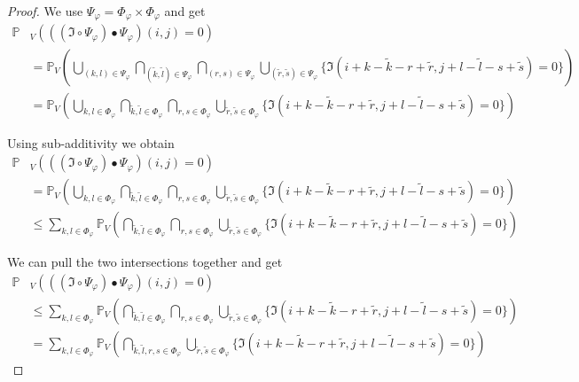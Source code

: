 \documentclass[a4paper,12pt]{article}
\theoremstyle{plain}
\theoremstyle{definition}
\begin{document}
\begin{proof}
	We use $\Psi_\varphi = \Phi_\varphi \times \Phi_\varphi$ and get
	\begin{align*}
		\mathbb{P}&_V( ((\mathfrak{I} \circ \Psi_\varphi) \bullet \Psi_\varphi)(i, j) = 0 ) \\
		&= \mathbb{P}_V\left( \bigcup_{(k, l) \in \Psi_\varphi} \bigcap_{(\tilde{k}, \tilde{l}) \in \Psi_\varphi} \bigcap_{(r, s) \in \Psi_\varphi} \bigcup_{(\tilde{r}, \tilde{s}) \in \Psi_\varphi} \{ \mathfrak{I}(i + k - \tilde{k} - r + \tilde{r}, j + l - \tilde{l} - s + \tilde{s}) = 0 \} \right) \\
		&= \mathbb{P}_V\left( \bigcup_{k, l \in \Phi_\varphi} \bigcap_{\tilde{k}, \tilde{l} \in \Phi_\varphi} \bigcap_{r, s \in \Phi_\varphi} \bigcup_{\tilde{r}, \tilde{s} \in \Phi_\varphi} \{ \mathfrak{I}(i + k - \tilde{k} - r + \tilde{r}, j + l - \tilde{l} - s + \tilde{s}) = 0 \} \right)
	\end{align*}
	
	Using sub-additivity we obtain
	\begin{align*}
		\mathbb{P}&_V( ((\mathfrak{I} \circ \Psi_\varphi) \bullet \Psi_\varphi)(i, j) = 0 ) \\
		&= \mathbb{P}_V\left( \bigcup_{k, l \in \Phi_\varphi} \bigcap_{\tilde{k}, \tilde{l} \in \Phi_\varphi} \bigcap_{r, s \in \Phi_\varphi} \bigcup_{\tilde{r}, \tilde{s} \in \Phi_\varphi} \{ \mathfrak{I}(i + k - \tilde{k} - r + \tilde{r}, j + l - \tilde{l} - s + \tilde{s}) = 0 \} \right) \\
		&\leq \sum_{k, l \in \Phi_\varphi} \mathbb{P}_V\left( \bigcap_{\tilde{k}, \tilde{l} \in \Phi_\varphi} \bigcap_{r, s \in \Phi_\varphi} \bigcup_{\tilde{r}, \tilde{s} \in \Phi_\varphi} \{ \mathfrak{I}(i + k - \tilde{k} - r + \tilde{r}, j + l - \tilde{l} - s + \tilde{s}) = 0 \} \right)
	\end{align*}
	
	We can pull the two intersections together and get
	\begin{align*}
		\mathbb{P}&_V( ((\mathfrak{I} \circ \Psi_\varphi) \bullet \Psi_\varphi)(i, j) = 0 ) \\
		&\leq \sum_{k, l \in \Phi_\varphi} \mathbb{P}_V\left( \bigcap_{\tilde{k}, \tilde{l} \in \Phi_\varphi} \bigcap_{r, s \in \Phi_\varphi} \bigcup_{\tilde{r}, \tilde{s} \in \Phi_\varphi} \{ \mathfrak{I}(i + k - \tilde{k} - r + \tilde{r}, j + l - \tilde{l} - s + \tilde{s}) = 0 \} \right) \\
		&= \sum_{k, l \in \Phi_\varphi} \mathbb{P}_V\left( \bigcap_{\tilde{k}, \tilde{l}, r, s \in \Phi_\varphi} \bigcup_{\tilde{r}, \tilde{s} \in \Phi_\varphi} \{ \mathfrak{I}(i + k - \tilde{k} - r + \tilde{r}, j + l - \tilde{l} - s + \tilde{s}) = 0 \} \right)
	\end{align*}
	

\end{proof}
\end{document}
